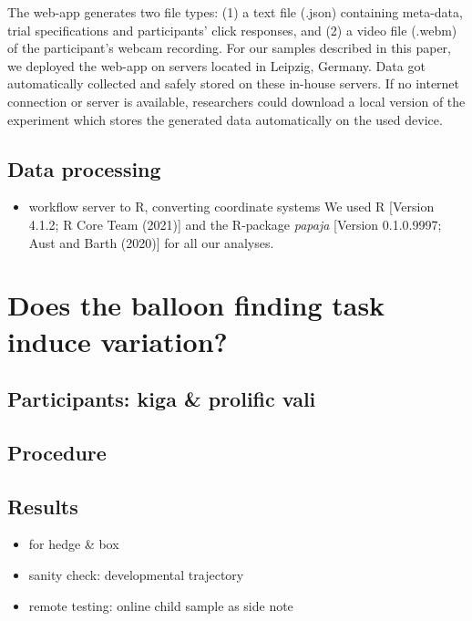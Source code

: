 \documentclass[
  english,
  man,floatsintext]{apa6}
\providecommand{\tightlist}{%
  \setlength{\itemsep}{0pt}\setlength{\parskip}{0pt}}
\begin{document}
The web-app generates two file types: (1) a text file (.json) containing meta-data, trial specifications and participants' click responses, and (2) a video file (.webm) of the participant's webcam recording.
For our samples described in this paper, we deployed the web-app on servers located in Leipzig, Germany. Data got automatically collected and safely stored on these in-house servers. If no internet connection or server is available, researchers could download a local version of the experiment which stores the generated data automatically on the used device.

\hypertarget{data-processing-1}{%
\subsection{Data processing}\label{data-processing-1}}

\begin{itemize}
\tightlist
\item
  workflow server to R, converting coordinate systems
  We used R {[}Version 4.1.2; R Core Team (2021){]} and the R-package \emph{papaja} {[}Version 0.1.0.9997; Aust and Barth (2020){]} for all our analyses.
\end{itemize}

\hypertarget{does-the-balloon-finding-task-induce-variation}{%
\section{Does the balloon finding task induce variation?}\label{does-the-balloon-finding-task-induce-variation}}

\hypertarget{participants-kiga-prolific-vali-1}{%
\subsection{Participants: kiga \& prolific vali}\label{participants-kiga-prolific-vali-1}}

\hypertarget{procedure-1}{%
\subsection{Procedure}\label{procedure-1}}

\hypertarget{results-3}{%
\subsection{Results}\label{results-3}}

\begin{itemize}
\tightlist
\item
  for hedge \& box
\item
  sanity check: developmental trajectory
\item
  remote testing: online child sample as side note
\end{itemize}
\end{document}
